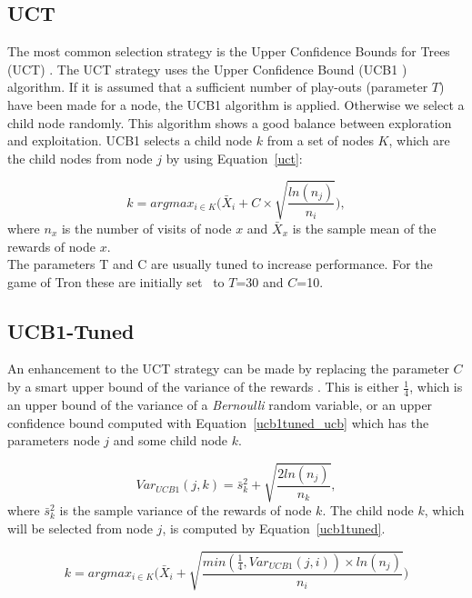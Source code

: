 \documentclass{article}
\begin{document}
\subsection{UCT}
\label{subsec:uct}
The most common selection strategy is the Upper Confidence Bounds for Trees (UCT) \cite{kocsis}. The UCT strategy uses the Upper Confidence Bound (UCB1 \cite{auer_et_al}) algorithm. If it is assumed that a sufficient number of play-outs (parameter $T$) have been made for a node, the UCB1 algorithm is applied. Otherwise we select a child node randomly. This algorithm shows a good balance between exploration and exploitation. UCB1 selects a child node $k$ from a set of nodes $K$, which are the child nodes from node $j$ by using Equation~\ref{uct}:

\begin{equation}\label{uct}
k = argmax_{i \in K} \bigg(\bar{X}_{i} + C \times \sqrt{\frac{ln (n_{j})}{n_{i}}}\bigg),
\end{equation}
where $n_{x}$ is the number of visits of node $x$ and $\bar{X}_{x}$ is the sample mean of the rewards of node $x$.\\The parameters T and C are usually tuned to increase performance. For the game of Tron these are initially set~\cite{teuling_tron} to $T$=30 and $C$=10.

\subsection{UCB1-Tuned}
\label{subsec:ucb1_tuned}
An enhancement to the UCT strategy can be made by replacing the parameter $C$ by a smart upper bound of the variance of the rewards \cite{cig_paper}. This is either $\frac{1}{4}$, which is an upper bound of the variance of a \emph{Bernoulli} random variable, or an upper confidence bound computed with Equation~\ref{ucb1tuned_ucb} which has the parameters node $j$ and some child node $k$.

\begin{equation}\label{ucb1tuned_ucb}
Var_{UCB1}(j,k)=\bar{s} ^2_{k}+\sqrt{\frac{2ln(n_{j})}{n_{k}}},
\end{equation}
where $\bar{s} ^2_{k}$ is the sample variance of the rewards of node $k$. The child node $k$, which will be selected from node $j$, is computed by Equation~\ref{ucb1tuned}.

\begin{equation}\label{ucb1tuned}
k = argmax_{i \in K} \bigg(\bar{X}_{i} + \sqrt{\frac{min(\frac{1}{4},Var_{UCB1}(j,i))\times ln (n_{j})}{n_{i}}}\bigg)
\end{equation}
\end{document}

